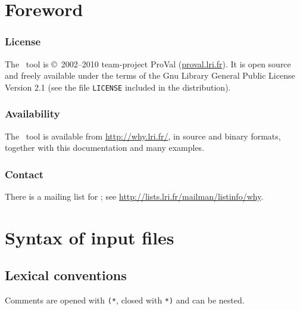 \documentclass[a4paper,12pt]{report}
\begin{document}


\tableofcontents

\chapter*{Foreword}



\subsection*{License}

The \why\ tool is \copyright\ 2002--2010 team-project ProVal
(\url{proval.lri.fr}).
It is open source and freely available under the terms of the Gnu
Library General Public License Version 2.1 (see the file
\texttt{LICENSE} included in the distribution).

\subsection*{Availability}

The \why\ tool is available from \url{http://why.lri.fr/}, in source
and binary formats, together with this documentation and many
examples.


\subsection*{Contact}

There is a mailing list for \why;
see \url{http://lists.lri.fr/mailman/listinfo/why}.



\chapter{Syntax of input files}
\label{syntax}

\section{Lexical conventions}

Comments are opened with \texttt{(*}, closed
with \texttt{*)} and can be nested.
\end{document}
